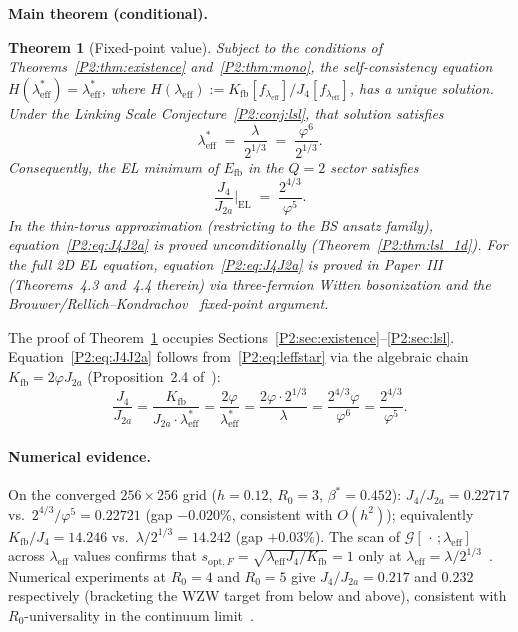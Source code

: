 \documentclass[11pt,a4paper]{article}
\newcommand{\vp}{\varphi}
\newcommand{\lam}{\lambda}
\newcommand{\leff}{\lambda_{\mathrm{eff}}}
\newcommand{\bst}{\beta^{*}}
\newcommand{\Kfb}{K_{\mathrm{fb}}}
\newcommand{\Efb}{E_{\mathrm{fb}}}
\newcommand{\Ja}{J_{2a}}
\newcommand{\Jfour}{J_{4}}
\newcommand{\G}{\mathcal{G}}
\newtheorem{theorem}{Theorem}[section]
\theoremstyle{remark}
\begin{document}
\textbf{Main theorem (conditional).}
\begin{theorem}[Fixed-point value]
\label{P2:thm:main}
Subject to the conditions of Theorems~\ref{P2:thm:existence}
and~\ref{P2:thm:mono}, the self-consistency equation $H(\leff^*)=\leff^*$,
where $H(\leff):=\Kfb[f_{\leff}]/\Jfour[f_{\leff}]$, has a unique solution.
Under the Linking Scale Conjecture~\ref{P2:conj:lsl}, that solution satisfies
\begin{equation}
  \leff^* \;=\; \frac{\lam}{2^{1/3}} \;=\; \frac{\vp^6}{2^{1/3}}.
  \label{P2:eq:leffstar}
\end{equation}
Consequently, the EL minimum of $\Efb$ in the $Q=2$ sector satisfies
\begin{equation}
  \frac{\Jfour}{\Ja}\bigg|_{\mathrm{EL}}
  \;=\; \frac{2^{4/3}}{\vp^5}.
  \label{P2:eq:J4J2a}
\end{equation}
In the thin-torus approximation (restricting to the BS ansatz family),
equation~\eqref{P2:eq:J4J2a} is proved unconditionally
(Theorem~\ref{P2:thm:lsl_1d}).
For the full 2D EL equation, equation~\eqref{P2:eq:J4J2a} is proved
in Paper~III~\cite{Paper3} (Theorems~4.3 and~4.4 therein) via
three-fermion Witten bosonization and the Brouwer/Rellich--Kondrachov~\cite{Evans2010}
fixed-point argument.
\end{theorem}

The proof of Theorem~\ref{P2:thm:main} occupies Sections~\ref{P2:sec:existence}--\ref{P2:sec:lsl}.
Equation~\eqref{P2:eq:J4J2a} follows from~\eqref{P2:eq:leffstar}
via the algebraic chain $\Kfb = 2\vp\Ja$ (Proposition~2.4 of~\cite{Paper1}):
\[
  \frac{\Jfour}{\Ja}
  = \frac{\Kfb}{\Ja\cdot\leff^*}
  = \frac{2\vp}{\leff^*}
  = \frac{2\vp\cdot 2^{1/3}}{\lam}
  = \frac{2^{4/3}\vp}{\vp^6}
  = \frac{2^{4/3}}{\vp^5}.
\]

\paragraph{Numerical evidence.}
On the converged $256\times 256$ grid ($h=0.12$, $R_0=3$, $\bst=0.452$):
$\Jfour/\Ja = 0.22717$ vs.\ $2^{4/3}/\vp^5=0.22721$ (gap $-0.020\%$,
consistent with $O(h^2)$);
equivalently $\Kfb/\Jfour = 14.246$ vs.\ $\lam/2^{1/3}=14.242$ (gap $+0.03\%$).
The scan of $\G[\,\cdot\,;\leff]$ across $\leff$ values confirms that
$s_{\mathrm{opt},F}=\sqrt{\leff\Jfour/\Kfb}=1$ only at
$\leff=\lam/2^{1/3}$~\cite{Paper1}.
Numerical experiments at $R_0=4$ and $R_0=5$ give
$\Jfour/\Ja = 0.217$ and $0.232$ respectively (bracketing the WZW target
from below and above), consistent with $R_0$-universality in the
continuum limit~\cite{Paper1}.
\end{document}
